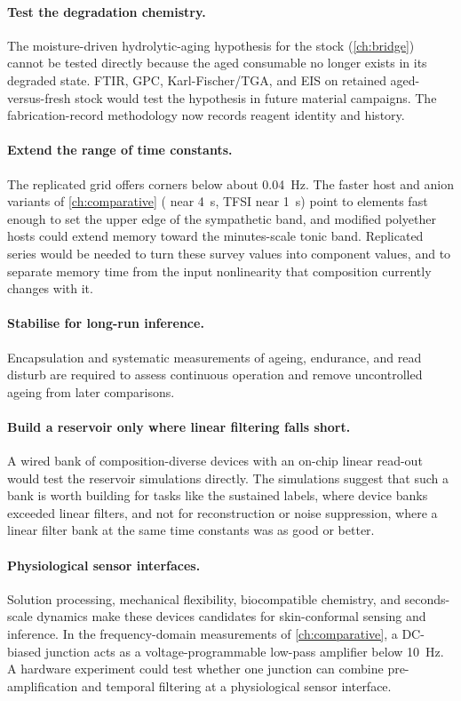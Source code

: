\documentclass[12pt, twoside]{report}
\begin{document}
\paragraph{Test the degradation chemistry.} The moisture-driven hydrolytic-aging hypothesis for the \Hybrane{} stock (\cref{ch:bridge}) cannot be tested directly because the aged consumable no longer exists in its degraded state. FTIR, GPC, Karl-Fischer/TGA, and EIS on retained aged-versus-fresh stock would test the hypothesis in future material campaigns. The fabrication-record methodology now records reagent identity and history.

\paragraph{Extend the range of time constants.} The replicated grid offers corners below about \SI{0.04}{\hertz}. The faster host and anion variants of \cref{ch:comparative} (\TMPE{} near \SI{4}{\second}, TFSI near \SI{1}{\second}) point to elements fast enough to set the upper edge of the sympathetic band, and modified polyether hosts could extend memory toward the minutes-scale tonic band. Replicated series would be needed to turn these survey values into component values, and to separate memory time from the input nonlinearity that composition currently changes with it.

\paragraph{Stabilise for long-run inference.} Encapsulation and systematic measurements of ageing, endurance, and read disturb are required to assess continuous operation and remove uncontrolled ageing from later comparisons.

\paragraph{Build a reservoir only where linear filtering falls short.} A wired bank of composition-diverse devices with an on-chip linear read-out would test the reservoir simulations directly. The simulations suggest that such a bank is worth building for tasks like the sustained \WESAD{} labels, where device banks exceeded linear filters, and not for reconstruction or noise suppression, where a linear filter bank at the same time constants was as good or better.

\paragraph{Physiological sensor interfaces.} Solution processing, mechanical flexibility, biocompatible chemistry, and seconds-scale dynamics make these devices candidates for skin-conformal sensing and inference. In the frequency-domain measurements of \cref{ch:comparative}, a DC-biased junction acts as a voltage-programmable low-pass amplifier below \SI{10}{\hertz}. A hardware experiment could test whether one junction can combine pre-amplification and temporal filtering at a physiological sensor interface.
\end{document}
